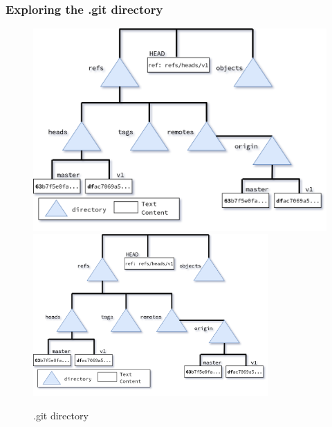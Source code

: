 \begin{frame}[fragile]
    \frametitle{Exploring the .git directory}
    \begin{figure}
        \begin{center}
            {
                \includegraphics[height=0.75\textheight,keepaspectratio]{./images/gitDirectory-Total.png}
            }
            {
                \includegraphics[height=0.75\textheight,width=0.8\textwidth]{./images/gitDirectory-Total.png}
            }
            \caption{.git directory}
        \end{center}
    \end{figure}
\end{frame}

